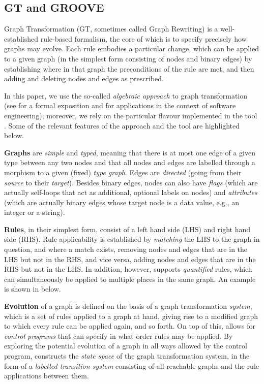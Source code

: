 
\subsection{GT and GROOVE}\label{sec:GTS}

Graph Transformation (GT, sometimes called Graph Rewriting) is a well-established rule-based formalism, the core of which is to specify precisely how graphs may evolve. Each rule embodies a particular change, which can be applied to a given graph (in the simplest form consisting of nodes and binary edges) by establishing where in that graph the preconditions of the rule are met, and then adding and deleting nodes and edges as prescribed.

In this paper, we use the so-called \emph{algebraic approach} to graph transformation (see \cite{DBLP:series/eatcs/EhrigEPT06} for a formal exposition and \cite{DBLP:books/sp/HeckelT20} for applications in the context of software engineering); moreover, we rely on the particular flavour implemented in the tool \GROOVE \cite{DBLP:journals/sttt/GhamarianMRZZ12,GROOVE}. Some of the relevant features of the approach and the tool are highlighted below.

\textbf{Graphs} are \emph{simple} and \emph{typed}, meaning that there is at most one edge of a given type between any two nodes and that all nodes and edges are labelled through a morphism to a given (fixed) \emph{type graph}. Edges are \emph{directed} (going from their \emph{source} to their \emph{target}). Besides binary edges, nodes can also have \emph{flags} (which are actually self-loops that act as additional, optional labels on nodes) and \emph{attributes} (which are actually binary edges whose target node is a data value, e.g., an integer or a string).

\textbf{Rules}, in their simplest form, consist of a left hand side (LHS) and right hand side (RHS). Rule applicability is established by \emph{matching} the LHS to the graph in question, and where a match exists, removing nodes and edges that are in the LHS but not in the RHS, and vice versa, adding nodes and edges that are in the RHS but not in the LHS. In addition, however, \GROOVE supports \emph{quantified} rules, which can simultaneously be applied to multiple places in the same graph. An example is shown in  below.

\textbf{Evolution} of a graph is defined on the basis of a graph transformation \emph{system}, which is a set of rules applied to a graph at hand, giving rise to a modified graph to which every rule can be applied again, and so forth. On top of this, \GROOVE allows for \emph{control programs} that can specify in what order rules may be applied. By exploring the potential evolution of a graph in all ways allowed by the control program, \GROOVE constructs the \emph{state space} of the graph transformation system, in the form of a \emph{labelled transition system} consisting of all reachable graphs and the rule applications between them.

